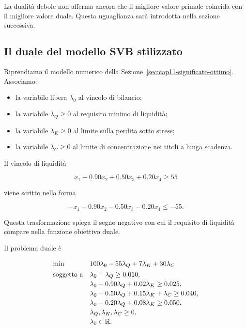 La dualit\`{a} debole non afferma ancora che il migliore valore primale
coincida con il migliore valore duale. Questa uguaglianza sar\`{a} introdotta
nella sezione successiva.

\subsection{Il duale del modello SVB stilizzato}

Riprendiamo il modello numerico della Sezione~\ref{sec:cap11-significato-ottimo}.
Associamo:

\begin{itemize}

\item la variabile libera \(\lambda_0\) al vincolo di bilancio;

\item la variabile \(\lambda_Q\geq0\) al requisito minimo di liquidit\`{a};

\item la variabile \(\lambda_K\geq0\) al limite sulla perdita sotto stress;

\item la variabile \(\lambda_C\geq0\) al limite di concentrazione nei titoli
a lunga scadenza.

\end{itemize}

Il vincolo di liquidit\`{a}

\[
x_1+0.90x_2+0.50x_3+0.20x_4\geq55
\]

viene scritto nella forma

\[
-x_1-0.90x_2-0.50x_3-0.20x_4\leq-55.
\]

Questa trasformazione spiega il segno negativo con cui il requisito di
liquidit\`{a} compare nella funzione obiettivo duale.

Il problema duale \`{e}

\[
\begin{array}{ll}
\min
&
100\lambda_0
-
55\lambda_Q
+
7\lambda_K
+
30\lambda_C
\\[4pt]
\mbox{soggetto a}
&
\lambda_0-\lambda_Q
\geq0.010,
\\[2pt]
&
\lambda_0-0.90\lambda_Q+0.02\lambda_K
\geq0.025,
\\[2pt]
&
\lambda_0-0.50\lambda_Q+0.15\lambda_K+\lambda_C
\geq0.040,
\\[2pt]
&
\lambda_0-0.20\lambda_Q+0.08\lambda_K
\geq0.050,
\\[2pt]
&
\lambda_Q,\lambda_K,\lambda_C\geq0,
\\[2pt]
&
\lambda_0\in\mathbb{R}.
\end{array}
\]

